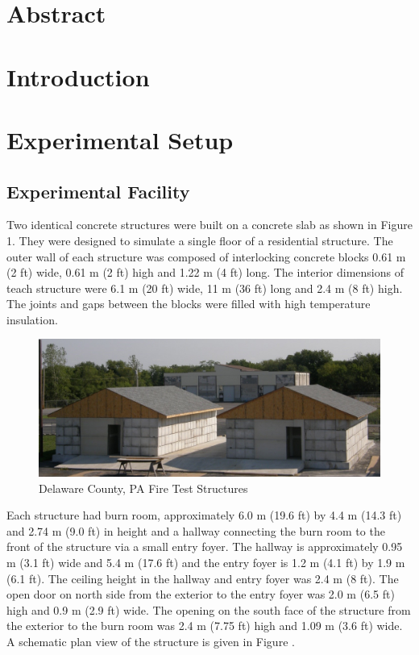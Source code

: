 \documentclass[12pt,oneside]{book}
\begin{document}
	\mainmatter
	
	\chapter{Abstract}
	\label{chap:Abstract} 
	
	\chapter{Introduction}
	\label{chap:Introduction}
	
	\chapter{Experimental Setup}
	\label{chap:Experimental_Setup}
	
	\section{Experimental Facility}
	\label{sec:Experimental_Facility}
	
	Two identical concrete structures were built on a concrete slab as shown in Figure 1. They were designed to simulate a single floor of a residential structure.  The outer wall of each structure was composed of interlocking concrete blocks 0.61 m (2 ft) wide, 0.61 m (2 ft) high and 1.22 m (4 ft) long.  The interior dimensions of teach structure were 6.1 m (20 ft) wide, 11 m (36 ft) long and 2.4 m (8 ft) high.  The joints and gaps between the blocks were filled with high temperature insulation.
	
		\begin{figure}[!ht]
			\includegraphics[width=6in]{../Figures/Pictures/DelCo_Structures}
			\caption{Delaware County, PA Fire Test Structures}
			\label{fig:Delaware_County,_PA_Fire_Test_Structures}
		\end{figure}
	
	Each structure had burn room, approximately 6.0 m (19.6 ft) by 4.4 m (14.3 ft) and 2.74 m (9.0 ft) in height and a hallway connecting the burn room to the front of the structure via a small entry foyer.  The hallway is approximately 0.95 m (3.1 ft) wide and 5.4 m (17.6 ft) and the entry foyer is 1.2 m (4.1 ft) by 1.9 m (6.1 ft).  The ceiling height in the hallway and entry foyer was 2.4 m (8 ft).  The open door on north side from the exterior to the entry foyer was 2.0 m (6.5 ft) high and 0.9 m (2.9 ft) wide.  The opening on the south face of the structure from the exterior to the burn room was 2.4 m (7.75 ft) high and 1.09 m (3.6 ft) wide.   A schematic plan view of the structure is given in Figure     .    
	
\end{document}
